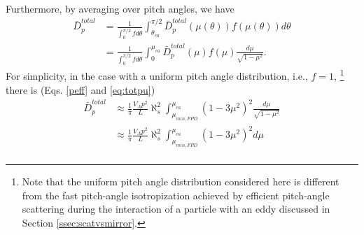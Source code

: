 \documentclass[preprint2,twocolumn,times,tighten]{aastex63}
\begin{document}
{%
{Furthermore, by averaging over pitch angles, we have} 
\begin{equation}
\begin{aligned}
    \bar{D}_p^{total}
    &=\frac{1}{\int_0^{\pi/2}f d\theta}
    \int_{\theta_{ca}}^{\pi/2} \bar{D}^{total}_p (\mu(\theta)) f (\mu(\theta)) d\theta \\
    &=\frac{1}{\int_0^{\pi/2}f d\theta} \int_0^{\mu_{ca}} \bar{D}_p^{total} (\mu) f (\mu) \frac{d\mu}{\sqrt{1-\mu^2}}.
    \label{Dpfast}
\end{aligned}
\end{equation}
For simplicity, in the case with a uniform pitch angle distribution, i.e., $f=1$,
\footnote{Note that the uniform pitch angle distribution considered here is different from the fast pitch-angle isotropization achieved by efficient pitch-angle scattering
during the interaction of a particle with an eddy discussed in Section \ref{ssec:scatvsmirror}.}
there is 
(Eqs. \eqref{peff} and \eqref{eq:totpu})
\begin{equation}\label{eq:dptamca}
\begin{aligned}
    \bar{D}_p^{total}
    &\approx \frac{1}{\pi} \frac{V_A p^2}{L} \aleph_s^2 \int_{\mu_{min,FPD}}^{\mu_{ca}} (1-3\mu^2)^2 \frac{d\mu}{\sqrt{1-\mu^2}} \\
    &\approx \frac{1}{\pi} \frac{V_A p^2}{L} \aleph_s^2 \int_{\mu_{min,FPD}}^{\mu_{ca}} (1-3\mu^2)^2 d\mu \\

\end{aligned}
\end{equation}}
\end{document}
